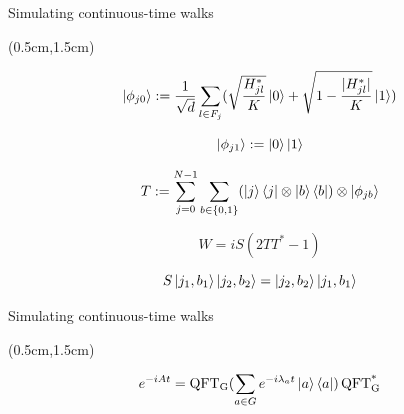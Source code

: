 \documentclass{beamer}
\theoremstyle{definition}
\begin{document}
\begin{frame}{Simulating continuous-time walks}
    
    \begin{textblock*}{12cm}(0.5cm,1.5cm)
      
        \[
        \ket{\phi_{j0}} := \frac{1}{\sqrt{d}}\sum_{l \in F_j}(\sqrt{\frac{H^*_{jl}}{K}}\ket{0} + \sqrt{1-\frac{|H^*_{jl}|}{K}}\ket{1})
        \]

        \[
        \ket{\phi_{j1}} := \ket{0}\ket{1}
        \]

        \[
        T := \sum_{j=0}^{N-1}\sum_{b \in {\{0,1\}}}(\ket{j}\bra{j}\otimes\ket{b}\bra{b})\otimes\ket{\phi_{jb}}
        \]

        \[
        W = iS(2TT^* - 1)
        \]

        \[
        S\ket{j_1,b_1}\ket{j_2,b_2} = \ket{j_2,b_2}\ket{j_1,b_1}
        \]



    \end{textblock*}

\end{frame}




\begin{frame}{Simulating continuous-time walks}
    
    \begin{textblock*}{12cm}(0.5cm,1.5cm)
      
       \[
       e^{-iAt} = \operatorname{QFT_G}(\sum_{a \in G}e^{-i\lambda_at}\ket{a}\bra{a})\operatorname{QFT^*_G}
       \]




    \end{textblock*}

\end{frame}








    


\end{document}
